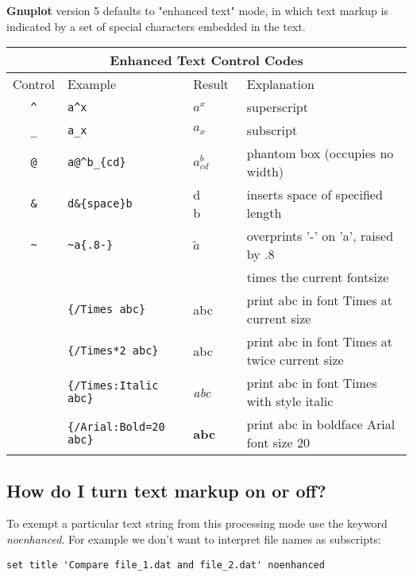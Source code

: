 \documentclass[a4paper,11pt]{article}
\newcommand{\Gnuplot}{\textbf{Gnuplot }}
\begin{document}
\Gnuplot version 5 defaults to "enhanced text" mode, in which text markup is
indicated by a set of special characters embedded in the text.

\begin{center}
\begin{tabular}{|clll|} \hline
\multicolumn{4}{|c|}{Enhanced Text Control Codes} \\ \hline
Control & Example & Result & Explanation \\ \hline
\verb~^~ & \verb~a^x~ & $a^x$ & superscript\\
\verb~_~ & \verb~a_x~ & $a_x$ & subscript\\
\verb~@~ & \verb~a@^b_{cd}~ & $a^b_{cd}$ &phantom box (occupies no width)\\
\verb~&~ & \verb~d&{space}b~ & d\verb*+     +b & inserts space of specified length\\
\verb|~| & \verb|~a{.8-}| & $\tilde{a}$ & overprints '-' on 'a', raised by .8\\
\verb~ ~ & \verb~ ~ & ~ ~ & times the current fontsize\\
\verb| | & \verb|{/Times abc}| & {\rm abc} & print abc in font Times at current size\\
\verb| | & \verb|{/Times*2 abc}| & \Large{\rm abc} & print abc in font Times at twice current size\\
\verb| | & \verb|{/Times:Italic abc}| & {\it abc} & print abc in font Times with style italic\\
\verb| | & \verb|{/Arial:Bold=20 abc}| & \Large\textsf{\textbf{abc}} & print abc in boldface Arial font size 20\\
\hline
\end{tabular}
\end{center}

\subsection{How do I turn text markup on or off?}

To exempt a particular text string from this processing mode use the keyword
{\em noenhanced}.  For example we don't want to interpret file names as subscripts:
\small
\begin{verbatim}
set title 'Compare file_1.dat and file_2.dat' noenhanced
\end{verbatim}
\normalsize
\end{document}
